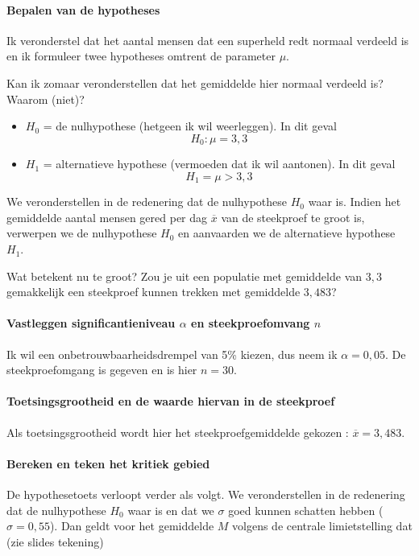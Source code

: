 \paragraph{Bepalen van de hypotheses}
Ik veronderstel dat het aantal mensen dat een superheld redt normaal verdeeld  is en ik formuleer twee hypotheses omtrent de parameter $\mu$.

\begin{exercise}
  Kan ik zomaar veronderstellen dat het gemiddelde hier normaal verdeeld is? Waarom (niet)?
\end{exercise}

\begin{itemize}
  \item $H_{0}$ = de nulhypothese (hetgeen ik wil weerleggen). In dit geval \[ H_{0} : \mu = 3,3 \]
  \item $H_{1}$ = alternatieve hypothese (vermoeden dat ik wil aantonen). In dit geval \[H_{1}= \mu > 3,3 \]
\end{itemize}
We veronderstellen in de redenering dat de nulhypothese $H_{0}$ waar is. Indien het gemiddelde aantal mensen gered per dag $\overline{x}$
van de steekproef te groot is, verwerpen we de nulhypothese $H_{0}$ en aanvaarden we de alternatieve hypothese $H_{1}$.

Wat betekent nu te groot? Zou je uit een populatie met gemiddelde van $3,3$ gemakkelijk een steekproef kunnen trekken met gemiddelde $3,483$?

\paragraph{Vastleggen significantieniveau $\alpha$ en steekproefomvang $n$}
Ik wil een onbetrouwbaarheidsdrempel van 5\% kiezen, dus neem ik $\alpha = 0,05$. De steekproefomgang is gegeven en is hier $n = 30$.

\paragraph{Toetsingsgrootheid en de waarde hiervan in de steekproef}
Als toetsingsgrootheid wordt hier het steekproefgemiddelde gekozen : $\overline{x} = 3,483$.

\paragraph{Bereken en teken het kritiek gebied}

De hypothesetoets verloopt verder als volgt. We veronderstellen in de redenering dat de nulhypothese $H_{0}$ waar is en dat we $\sigma$ goed kunnen schatten hebben ($\sigma = 0,55$). Dan geldt voor het gemiddelde $M$ volgens de centrale limietstelling dat (zie slides tekening)

